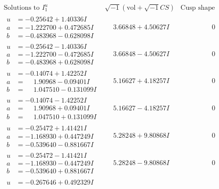 \documentclass[1p]{elsarticle_modified}
\theoremstyle{definition}
\newcommand{\I}{\sqrt{-1}}
\begin{document}
$$\begin{array}{c|c|c}
\text{Solutions to }I^u_{1}& \I (\text{vol} + \sqrt{-1}CS) & \text{Cusp shape}\\
 \hline 
\begin{aligned}
u &= -0.25642 + 1.40336 I \\
a &= -1.222700 + 0.472685 I \\
b &= -0.483968 - 0.628098 I\end{aligned}
 & \phantom{-}3.66848 + 4.50627 I & \phantom{-0.000000 } 0 \\ \hline\begin{aligned}
u &= -0.25642 - 1.40336 I \\
a &= -1.222700 - 0.472685 I \\
b &= -0.483968 + 0.628098 I\end{aligned}
 & \phantom{-}3.66848 - 4.50627 I & \phantom{-0.000000 } 0 \\ \hline\begin{aligned}
u &= -0.14074 + 1.42252 I \\
a &= \phantom{-}1.90968 - 0.09401 I \\
b &= \phantom{-}1.047510 - 0.131099 I\end{aligned}
 & \phantom{-}5.16627 + 4.18257 I & \phantom{-0.000000 } 0 \\ \hline\begin{aligned}
u &= -0.14074 - 1.42252 I \\
a &= \phantom{-}1.90968 + 0.09401 I \\
b &= \phantom{-}1.047510 + 0.131099 I\end{aligned}
 & \phantom{-}5.16627 - 4.18257 I & \phantom{-0.000000 } 0 \\ \hline\begin{aligned}
u &= -0.25472 + 1.41421 I \\
a &= -1.168930 + 0.447249 I \\
b &= -0.539640 - 0.881667 I\end{aligned}
 & \phantom{-}5.28248 + 9.80868 I & \phantom{-0.000000 } 0 \\ \hline\begin{aligned}
u &= -0.25472 - 1.41421 I \\
a &= -1.168930 - 0.447249 I \\
b &= -0.539640 + 0.881667 I\end{aligned}
 & \phantom{-}5.28248 - 9.80868 I & \phantom{-0.000000 } 0 \\ \hline\begin{aligned}
u &= -0.267646 + 0.492329 I \\

\end{aligned}
\end{array}$$
\end{document}
